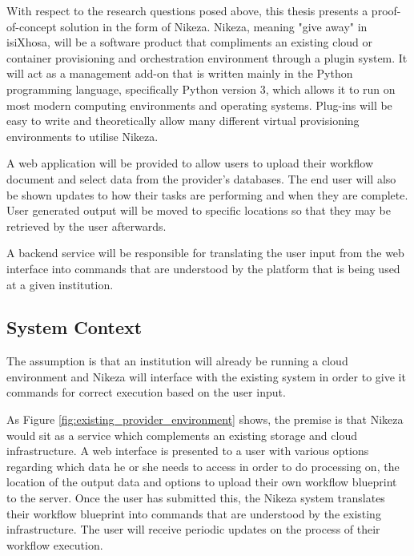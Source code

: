 With respect to the research questions posed above, this thesis presents a proof-of-concept solution in the form of Nikeza. Nikeza, meaning "give away" in isiXhosa, will be a software product that compliments an existing cloud or container provisioning and orchestration environment through a plugin system. It will act as a management add-on that is written mainly in the Python programming language, specifically Python version 3, which allows it to run on most modern computing environments and operating systems. Plug-ins will be easy to write and theoretically allow many different virtual provisioning environments to utilise Nikeza.

A web application will be provided to allow users to upload their workflow document and select data from the provider's databases. The end user will also be shown updates to how their tasks are performing and when they are complete. User generated output will be moved to specific locations so that they may be retrieved by the user afterwards.

A backend service will be responsible for translating the user input from the web interface into commands that are understood by the platform that is being used at a given institution.

\subsection{System Context}

The assumption is that an institution will already be running a cloud environment and Nikeza will interface with the existing system in order to give it commands for correct execution based on the user input.

As Figure \ref{fig:existing_provider_environment} shows, the premise is that Nikeza would sit as a service which complements an existing storage and cloud infrastructure. A web interface is presented to a user with various options regarding which data he or she needs to access in order to do processing on, the location of the output data and options to upload their own workflow blueprint to the server. Once the user has submitted this, the Nikeza system translates their workflow blueprint into commands that are understood by the existing infrastructure. The user will receive periodic updates on the process of their workflow execution.

